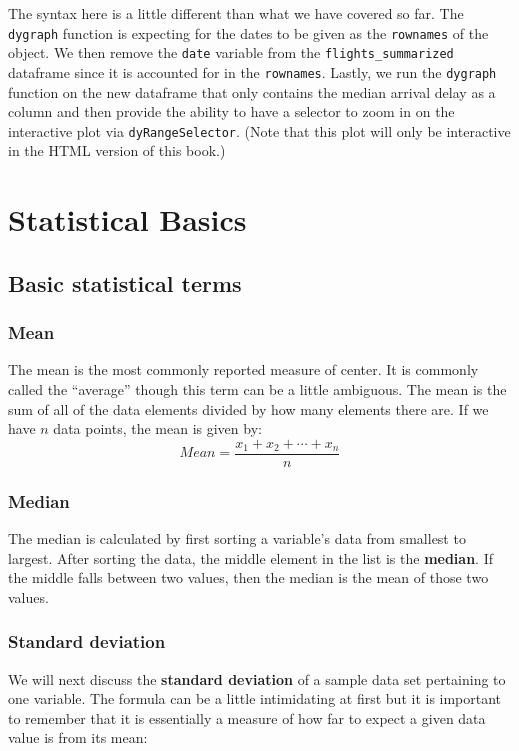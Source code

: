 \documentclass[]{tufte-book}
\begin{document}
The syntax here is a little different than what we have covered so far.
The \texttt{dygraph} function is expecting for the dates to be given as
the \texttt{rownames} of the object. We then remove the \texttt{date}
variable from the \texttt{flights\_summarized} dataframe since it is
accounted for in the \texttt{rownames}. Lastly, we run the
\texttt{dygraph} function on the new dataframe that only contains the
median arrival delay as a column and then provide the ability to have a
selector to zoom in on the interactive plot via
\texttt{dyRangeSelector}. (Note that this plot will only be interactive
in the HTML version of this book.)

\chapter{Statistical Basics}\label{appendix2}

\section{Basic statistical terms}\label{basic-statistical-terms}

\subsection{Mean}\label{mean}

The mean is the most commonly reported measure of center. It is commonly
called the ``average'' though this term can be a little ambiguous. The
mean is the sum of all of the data elements divided by how many elements
there are. If we have \(n\) data points, the mean is given by:
\[Mean = \frac{x_1 + x_2 + \cdots + x_n}{n}\]

\subsection{Median}\label{median}

The median is calculated by first sorting a variable's data from
smallest to largest. After sorting the data, the middle element in the
list is the \textbf{median}. If the middle falls between two values,
then the median is the mean of those two values.

\subsection{Standard deviation}\label{standard-deviation}

We will next discuss the \textbf{standard deviation} of a sample data
set pertaining to one variable. The formula can be a little intimidating
at first but it is important to remember that it is essentially a
measure of how far to expect a given data value is from its mean:
\end{document}

